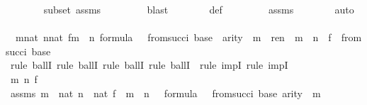 \begin{isabellebody}
\ \ \ \ \ \ \isamarkupfalse%
\ {\isasymDelta}{}{\isacharunderscore}{\kern0pt}subset\ assms{}\isanewline
\ \ \ \ \ \ \ \isamarkupfalse%
\ blast\isanewline
\ \ \ \ \ \ \isamarkupfalse%
\ {\isasymDelta}{}{\isacharunderscore}{\kern0pt}def\ \isanewline
\ \ \ \ \ \ \isamarkupfalse%
\ assms{}\isanewline
\ \ \ \ \ \ \isamarkupfalse%
\ auto\isanewline
\isanewline
\ \ \ \ \isamarkupfalse%
\ {\isachardoublequoteopen}\ {\isasymforall}m{\isasymin}nat{\isachardot}{\kern0pt}\ {\isasymforall}n{\isasymin}nat{\isachardot}{\kern0pt}\ {\isasymforall}f{\isasymin}m\ {\isasymrightarrow}\ n{\isachardot}{\kern0pt}\ {\isasymforall}{\isasymphi}{\isasymin}formula{\isachardot}{\kern0pt}\ {\isasymphi}\ {\isasymin}\ {\isasymDelta}{}{\isacharunderscore}{\kern0pt}from{\isacharcircum}{\kern0pt}succ{\isacharparenleft}{\kern0pt}i{\isacharparenright}{\kern0pt}\ {\isacharparenleft}{\kern0pt}{\isasymDelta}{}{\isacharunderscore}{\kern0pt}base{\isacharparenright}{\kern0pt}\ {\isasymlongrightarrow}\ arity{\isacharparenleft}{\kern0pt}{\isasymphi}{\isacharparenright}{\kern0pt}\ {\isasymle}\ m\ {\isasymlongrightarrow}\ ren{\isacharparenleft}{\kern0pt}{\isasymphi}{\isacharparenright}{\kern0pt}\ {\isacharbackquote}{\kern0pt}\ m\ {\isacharbackquote}{\kern0pt}\ n\ {\isacharbackquote}{\kern0pt}\ f\ {\isasymin}\ {\isasymDelta}{}{\isacharunderscore}{\kern0pt}from{\isacharcircum}{\kern0pt}succ{\isacharparenleft}{\kern0pt}i{\isacharparenright}{\kern0pt}\ {\isacharparenleft}{\kern0pt}{\isasymDelta}{}{\isacharunderscore}{\kern0pt}base{\isacharparenright}{\kern0pt}{\isachardoublequoteclose}\ \isanewline
\ \ \ \ \isamarkupfalse%
\ {\isacharparenleft}{\kern0pt}rule\ ballI{\isacharcomma}{\kern0pt}\ rule\ ballI{\isacharcomma}{\kern0pt}\ rule\ ballI{\isacharcomma}{\kern0pt}\ rule\ ballI\ {\isacharcomma}{\kern0pt}\ rule\ impI{\isacharcomma}{\kern0pt}\ rule\ impI{\isacharparenright}{\kern0pt}\isanewline
\ \ \ \ \ \ \isamarkupfalse%
\ m\ n\ f\ {\isasymphi}\ \isanewline
\ \ \ \ \ \ \isamarkupfalse%
\ assms{}{\isacharcolon}{\kern0pt}\ {\isachardoublequoteopen}m\ {\isasymin}\ nat{\isachardoublequoteclose}\ {\isachardoublequoteopen}n\ {\isasymin}\ nat{\isachardoublequoteclose}\ {\isachardoublequoteopen}f\ {\isasymin}\ m\ {\isasymrightarrow}\ n{\isachardoublequoteclose}\ {\isachardoublequoteopen}{\isasymphi}\ {\isasymin}\ formula{\isachardoublequoteclose}\ {\isachardoublequoteopen}{\isasymphi}\ {\isasymin}\ {\isasymDelta}{}{\isacharunderscore}{\kern0pt}from{\isacharcircum}{\kern0pt}succ{\isacharparenleft}{\kern0pt}i{\isacharparenright}{\kern0pt}\ {\isacharparenleft}{\kern0pt}{\isasymDelta}{}{\isacharunderscore}{\kern0pt}base{\isacharparenright}{\kern0pt}{\isachardoublequoteclose}\ {\isachardoublequoteopen}arity{\isacharparenleft}{\kern0pt}{\isasymphi}{\isacharparenright}{\kern0pt}\ {\isasymle}\ m{\isachardoublequoteclose}\isanewline

\end{isabellebody}
